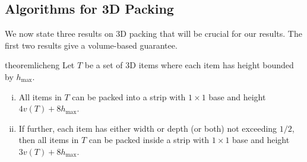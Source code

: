 \documentclass[a4paper,UKenglish,cleveref, autoref, thm-restate]{lipics-v2021}
\begin{document}
\subsection{Algorithms for 3D Packing}
We now state three results on 3D packing that will be crucial for our results.
The first two results give a volume-based guarantee.


\begin{restatable}{theorem}{licheng}
\label{thm:licheng}
    Let $T$ be a set of 3D items where each item has height bounded by $h_{\max}$. 
    \begin{enumerate}[(i)]
        \item All items in $T$ can be packed into a strip with $1\times 1$ base and height $4v(T) + 8h_{\max}$.
        \item If further, each item has either width or depth (or both) not exceeding $1/2$, then all items in $T$ can be packed inside a strip with $1\times 1$ base and height $3v(T)+8h_{\max}$.
    \end{enumerate}
\end{restatable}
\end{document}
